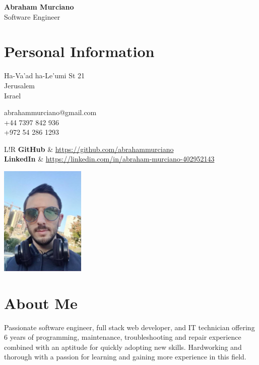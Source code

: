 \documentclass{article}
\newcommand\VRule{\color{lightgray}\vrule width 0.4pt}
\begin{document}
\hspace{-19.4pt}
\begin{minipage}{0.8\textwidth}
	{\bfseries\Huge Abraham Murciano}\vspace{4pt}\\
	{\large Software Engineer}

	\section*{Personal Information}
	\begin{multicols}{2}
		Ha-Va'ad ha-Le'umi St 21\\
		Jerusalem\\
		Israel
		\columnbreak

		abrahammurciano@gmail.com\\
		+44 7397 842 936\\
		+972 54 286 1293
		\columnbreak
	\end{multicols}
	\begin{tabular}{L!{\VRule}R}
		\textbf{GitHub}   & \url{https://github.com/abrahammurciano} \\
		\textbf{LinkedIn} & \url{https://linkedin.com/in/abraham-murciano-402952143}
	\end{tabular}
\end{minipage}
%
\hspace{-20pt}
\begin{minipage}{115pt}
	\begin{flushright}
		\includegraphics[width=115pt]{profile-portrait.jpg}
	\end{flushright}
\end{minipage}

\section*{About Me}
Passionate software engineer, full stack web developer, and IT technician offering 6 years of programming, maintenance, troubleshooting and repair experience combined with an aptitude for quickly adopting new skills. Hardworking and thorough with a passion for learning and gaining more experience in this field.
\end{document}
